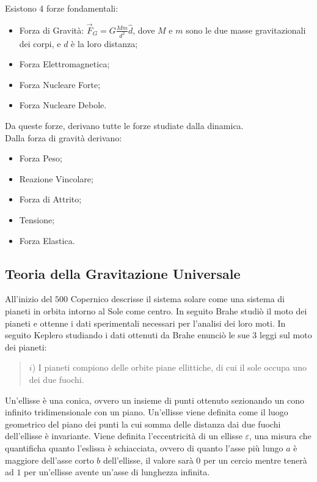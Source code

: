 \documentclass{article}
\numberwithin{equation}{subsection}
\begin{document}
Esistono 4 forze fondamentali:
\begin{itemize}
    \item Forza di Gravità: $\vec{F}_G = \displaystyle G\frac{Mm}{d^{2}}\hat{d}$, dove $M$ e $m$ sono 
    le due masse gravitazionali dei corpi, e $d$ è la loro distanza;
    \item Forza Elettromagnetica;
    \item Forza Nucleare Forte;
    \item Forza Nucleare Debole.
\end{itemize}
Da queste forze, derivano tutte le forze studiate dalla 
dinamica.\\
Dalla forza di gravità derivano:

\begin{itemize}
    \item Forza Peso;
    \item Reazione Vincolare;
    \item Forza di Attrito;
    \item Tensione;
    \item Forza Elastica.
\end{itemize}

\subsection{Teoria della Gravitazione Universale}

All'inizio del $500$ Copernico descrisse il sistema solare come una sistema di pianeti in orbita intorno al Sole come centro. In seguito Brahe studiò 
il moto dei pianeti e ottenne i dati sperimentali necessari per l'analisi dei loro moti. In seguito Keplero studiando i dati ottenuti da Brahe 
enunciò le sue $3$ leggi sul moto dei pianeti:

\begin{quotation}
    $i$) I pianeti compiono delle orbite piane ellittiche, di cui il sole occupa uno dei due fuochi.
\end{quotation}

Un'ellisse è una conica, ovvero un insieme di punti ottenuto sezionando un cono infinito tridimensionale con un piano. Un'ellisse viene definita 
come il luogo geometrico del piano dei punti la cui somma delle distanza dai due fuochi dell'ellisse è invariante. Viene definita l'eccentricità 
di un ellisse $\varepsilon$, una misura che quantificha quanto l'eslissa è schiacciata, ovvero di quanto l'asse più lungo $a$ è maggiore dell'asse 
corto $b$ dell'ellisse, il valore sarà $0$ per un cercio mentre tenerà ad $1$ per un'ellisse avente un'asse di lunghezza infinita. 
\end{document}
